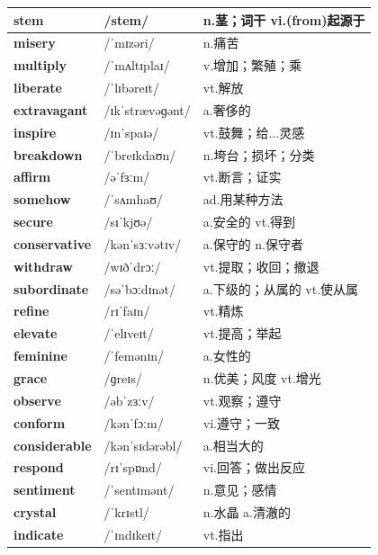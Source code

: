 \documentclass[14pt,a4paper]{extarticle}
\begin{document}
\begin{longtable}{ p{} p{} p{} }
\textbf{stem} & /stem/ & n.茎；词干 \quad vi.(from)起源于 \\ \hline
\textbf{misery} & /ˈmɪzəri/ & n.痛苦 \\ \hline
\textbf{multiply} & /ˈmʌltɪplaɪ/ & v.增加；繁殖；乘 \\ \hline
\textbf{liberate} & /ˈlɪbəreɪt/ & vt.解放 \\ \hline
\textbf{extravagant} & /ɪkˈstrævəɡənt/ & a.奢侈的 \\ \hline
\textbf{inspire} & /ɪnˈspaɪə/ & vt.鼓舞；给...灵感 \\ \hline
\textbf{breakdown} & /ˈbreɪkdaʊn/ & n.垮台；损坏；分类 \\ \hline
\textbf{affirm} & /əˈfɜːm/ & vt.断言；证实 \\ \hline
\textbf{somehow} & /ˈsʌmhaʊ/ & ad.用某种方法 \\ \hline
\textbf{secure} & /sɪˈkjʊə/ & a.安全的 \quad vt.得到 \\ \hline
\textbf{conservative} & /kənˈsɜːvətɪv/ & a.保守的 \quad n.保守者 \\ \hline
\textbf{withdraw} & /wɪðˈdrɔː/ & vt.提取；收回；撤退 \\ \hline
\textbf{subordinate} & /səˈbɔːdɪnət/ & a.下级的；从属的 \quad vt.使从属 \\ \hline
\textbf{refine} & /rɪˈfaɪn/ & vt.精炼 \\ \hline
\textbf{elevate} & /ˈelɪveɪt/ & vt.提高；举起 \\ \hline
\textbf{feminine} & /ˈfemənɪn/ & a.女性的 \\ \hline
\textbf{grace} & /ɡreɪs/ & n.优美；风度 \quad vt.增光 \\ \hline
\textbf{observe} & /əbˈzɜːv/ & vt.观察；遵守 \\ \hline
\textbf{conform} & /kənˈfɔːm/ & vi.遵守；一致 \\ \hline
\textbf{considerable} & /kənˈsɪdərəbl/ & a.相当大的 \\ \hline
\textbf{respond} & /rɪˈspɒnd/ & vi.回答；做出反应 \\ \hline
\textbf{sentiment} & /ˈsentɪmənt/ & n.意见；感情 \\ \hline
\textbf{crystal} & /ˈkrɪstl/ & n.水晶 \quad a.清澈的 \\ \hline
\textbf{indicate} & /ˈɪndɪkeɪt/ & vt.指出 \\ \hline
\end{longtable}

\newpage
\end{document}

